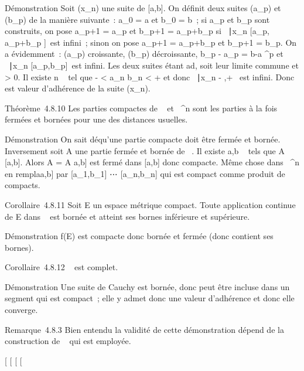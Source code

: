 \documentclass[]{article}
\begin{document}
Démonstration Soit (x\_n) une suite de {[}a,b{]}. On définit
deux suites (a\_p) et (b\_p) de la manière suivante~:
a\_0 = a et b\_0 = b~; si a\_p et b\_p
sont construits, on pose a\_p+1 = a\_p et b\_p+1
= a\_p+b\_p  si
\n \in {}~∣x\_n \in
{[}a\_p, a\_p+b\_p 
{]}\ est infini~; sinon on pose a\_p+1 =
a\_p+b\_p  et b\_p+1 =
b\_p. On a évidemment~: (a\_p) croissante,
(b\_p) décroissante, b\_p - a\_p = b-a
^p et \n \in
{}~∣x\_n \in
{[}a\_p,b\_p{]}\ est infini. Les deux
suites étant ad\jmathacentes, soit \ell leur limite commune et \epsilon \textgreater{}
0. Il existe n \in {}~ tel que \ell - \epsilon \textless{} a\_n \leq \ell \leq
b\_n \textless{} \ell + \epsilon et donc \n \in
{}~∣x\_n \in{]}\ell - \epsilon,\ell +
\epsilon{[}\ est infini. Donc \ell est valeur d'adhérence de la
suite (x\_n).

Théorème~4.8.10 Les parties compactes de ~ et ~^n sont les
parties à la fois fermées et bornées pour une des distances usuelles.

Démonstration On sait dé qu'une partie compacte doit être fermée et
bornée. Inversement soit A une partie fermée et bornée de ~. Il existe
a,b \in {}~ tels que A \subset~ {[}a,b{]}. Alors A = A \bigcap {[}a,b{]} est fermé dans
{[}a,b{]} donc compacte. Même chose dans ~^n en
rempla\ccant {[}a,b{]} par
{[}a\_1,b\_1{]} \times⋯ \times
{[}a\_n,b\_n{]} qui est compact comme produit de
compacts.

Corollaire~4.8.11 Soit E un espace métrique compact. Toute application
continue de E dans ~ est bornée et atteint ses bornes inférieure et
supérieure.

Démonstration f(E) est compacte donc bornée et fermée (donc contient ses
bornes).

Corollaire~4.8.12 ~ est complet.

Démonstration Une suite de Cauchy est bornée, donc peut être incluse
dans un segment qui est compact~; elle y admet donc une valeur
d'adhérence et donc elle converge.

Remarque~4.8.3 Bien entendu la validité de cette démonstration dépend de
la construction de ~ qui est employée.

{[}
{[}
{[}
{[}
\end{document}
